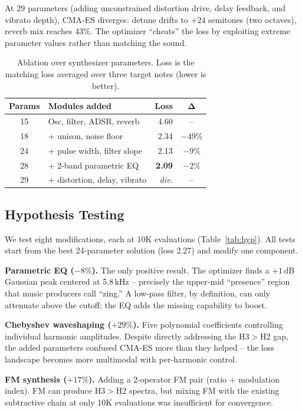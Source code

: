 \documentclass[10pt,twocolumn]{article}
\begin{document}
At 29 parameters (adding unconstrained distortion drive, delay feedback, and vibrato depth), CMA-ES diverges: detune drifts to $+24$ semitones (two octaves), reverb mix reaches 43\%. The optimizer ``cheats'' the loss by exploiting extreme parameter values rather than matching the sound.

\begin{table}[t]
\centering
\small
\caption{Ablation over synthesizer parameters. Loss is the matching loss averaged over three target notes (lower is better).}
\label{tab:main}
\begin{tabular}{@{}clrc@{}}
\toprule
\textbf{Params} & \textbf{Modules added} & \textbf{Loss} & $\boldsymbol{\Delta}$ \\
\midrule
15 & Osc, filter, ADSR, reverb & 4.60 & -- \\
18 & + unison, noise floor & 2.34 & $-49\%$ \\
24 & + pulse width, filter slope & 2.13 & $-9\%$ \\
28 & + 2-band parametric EQ & \textbf{2.09} & $-2\%$ \\
29 & + distortion, delay, vibrato & \emph{div.} & -- \\
\bottomrule
\end{tabular}
\end{table}

\subsection{Hypothesis Testing}

We test eight modifications, each at 10K evaluations (Table~\ref{tab:hyp}). All tests start from the best 24-parameter solution (loss 2.27) and modify one component.

\textbf{Parametric EQ ($-8\%$).} The only positive result. The optimizer finds a $+1$\,dB Gaussian peak centered at 5.8\,kHz -- precisely the upper-mid ``presence'' region that music producers call ``zing.'' A low-pass filter, by definition, can only attenuate above the cutoff; the EQ adds the missing capability to boost.

\textbf{Chebyshev waveshaping ($+29\%$).} Five polynomial coefficients controlling individual harmonic amplitudes. Despite directly addressing the H3$>$H2 gap, the added parameters confused CMA-ES more than they helped -- the loss landscape becomes more multimodal with per-harmonic control.

\textbf{FM synthesis ($+17\%$).} Adding a 2-operator FM pair (ratio + modulation index). FM can produce H3$>$H2 spectra, but mixing FM with the existing subtractive chain at only 10K evaluations was insufficient for convergence.
\end{document}
